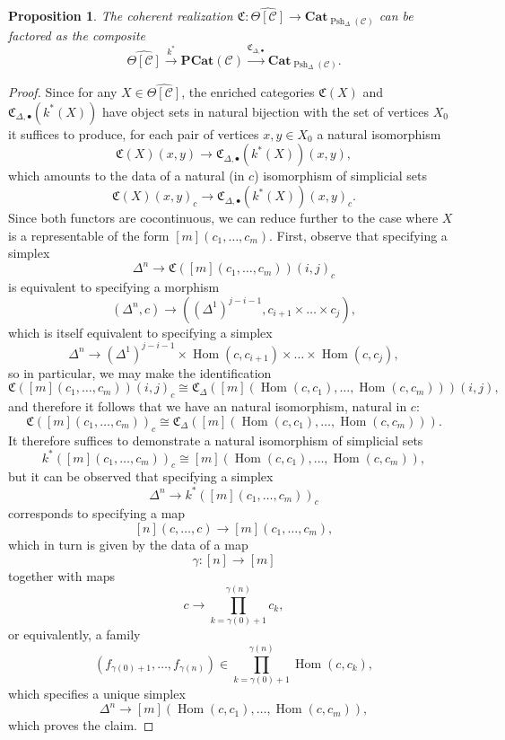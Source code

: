 \documentclass[leqno]{article}
\numberwithin{equation}{subsection}
\theoremstyle{plain}   %
\newtheorem{prop}[equation]{Proposition}
\theoremstyle{remark}
\theoremstyle{plain}
\newcommand{\Cat}{\ensuremath{\mathbf{Cat}}}
\DeclareMathOperator{\Hom}{Hom}
\newcommand{\C}{\ensuremath{\mathcal{C}}}
\newcommand{\cellset}{\ensuremath{\widehat{\Theta[\mathcal{C}]}}}
\newcommand{\spsh}{\ensuremath{\operatorname{Psh}_\Delta(\mathcal{C})}}
\begin{document}
\begin{prop}\label{pointwise}
	The coherent realization \(\mathfrak{C}:\cellset \to \Cat_{\spsh}\) can be factored as the composite 
	\[
		\cellset \xrightarrow{k^\ast} \mathbf{PCat}(\C) \xrightarrow{\mathfrak{C}_{\Delta,\bullet}} \Cat_{\spsh}.
	\] 
\end{prop}
\begin{proof} 
	Since for any \(X\in \cellset\), the enriched categories \(\mathfrak{C}(X)\) and \(\mathfrak{C}_{\Delta,\bullet}( k^\ast(X))\) have object sets in natural bijection with the set of vertices \(X_0\) it suffices to produce, for each pair of vertices \(x, y \in X_0\) a natural isomorphism
	\[
		\mathfrak{C}(X)(x, y) \to \mathfrak{C}_{\Delta,\bullet}( k^\ast(X))(x,y),
	\] 
	which amounts to the data of a natural (in \(c\)) isomorphism of simplicial sets
	\[
		\mathfrak{C}(X)(x, y)_{c} \to \mathfrak{C}_{\Delta,\bullet}( k^\ast(X))(x,y)_{c}.
	\] 
	Since both functors are cocontinuous, we can reduce further to the case where \(X\) is a representable of the form \([m](c_1,\dots,c_m)\). 
	First, observe that specifying a simplex 
	\[
		\Delta^n \to \mathfrak{C}([m](c_1,\dots,c_m))(i, j)_{c}
	\]
	is equivalent to specifying a morphism 
	\[
		(\Delta^n, c)\to ((\Delta^1)^{j-i-1}, c_{i+1}\times \dots\times c_j),
	\]
	which is itself equivalent to specifying a simplex
	\[
		\Delta^n \to (\Delta^1)^{j-i-1} \times \Hom(c,c_{i+1}) \times \dots \times \Hom(c,c_j),
	\]
	so in particular, we may make the identification
	\[
		\mathfrak{C}([m](c_1,\dots,c_m))(i, j)_{c} \cong \mathfrak{C}_\Delta([m](\Hom(c,c_1),\dots,\Hom(c,c_m)))(i, j),
	\]
	and therefore it follows that we have an natural isomorphism, natural in \(c\):
	\[
		\mathfrak{C}([m](c_1,\dots,c_m))_{c} \cong \mathfrak{C}_\Delta([m](\Hom(c,c_1),\dots,\Hom(c,c_m))).
	\]
	It therefore suffices to demonstrate a natural isomorphism of simplicial sets
	\[
		k^\ast([m](c_1,\dots,c_m))_c\cong [m](\Hom(c,c_1),\dots,\Hom(c,c_m)),
	\]
	but it can be observed that specifying a simplex 
	\[
		\Delta^n \to k^\ast([m](c_1,\dots,c_m))_c
	\]
	corresponds to specifying a map
	\[
		[n](c,\dots,c) \to [m](c_1,\dots,c_m),
	\]
	which in turn is given by the data of a map
	\[
		\gamma:[n]\to [m]
	\]
	together with maps 
	\[
		c\to \prod_{k=\gamma(0)+1}^{\gamma(n)} c_k,
	\]
	or equivalently, a family
	\[
		(f_{\gamma(0)+1}, \dots, f_{\gamma(n)}) \in \prod_{k=\gamma(0)+1}^{\gamma(n)} \Hom(c,c_k),
	\]
	which specifies a unique simplex 
	\[
		\Delta^n \to [m](\Hom(c,c_1),\dots,\Hom(c,c_m)),
	\]
	which proves the claim.
\end{proof}
\end{document}
